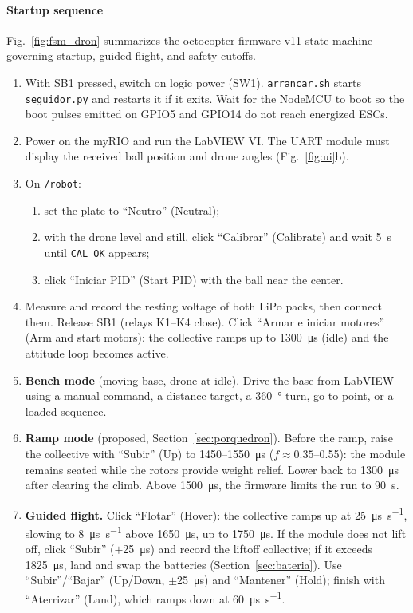 \paragraph{Startup sequence}
Fig.~\ref{fig:fsm_dron} summarizes the octocopter firmware v11 state machine governing startup, guided flight, and safety cutoffs.
\begin{enumerate}
  \item With SB1 pressed, switch on logic power (SW1). \texttt{arrancar.sh} starts \texttt{seguidor.py} and restarts it if it exits. Wait for the NodeMCU to boot so the boot pulses emitted on GPIO5 and GPIO14 do not reach energized ESCs.
  \item Power on the myRIO and run the LabVIEW VI. The UART module must display the received ball position and drone angles (Fig.~\ref{fig:ui}b).
  \item On \texttt{/robot}:
  \begin{enumerate}[label=\alph*.]
    \item set the plate to ``Neutro'' (Neutral);
    \item with the drone level and still, click ``Calibrar'' (Calibrate) and wait \SI{5}{\second} until \texttt{CAL OK} appears;
    \item click ``Iniciar PID'' (Start PID) with the ball near the center.
  \end{enumerate}
  \item Measure and record the resting voltage of both LiPo packs, then connect them. Release SB1 (relays K1--K4 close). Click ``Armar e iniciar motores'' (Arm and start motors): the collective ramps up to \SI{1300}{\micro\second} (idle) and the attitude loop becomes active.
  \item \textbf{Bench mode} (moving base, drone at idle). Drive the base from LabVIEW using a manual command, a distance target, a \SI{360}{\degree} turn, go-to-point, or a loaded sequence.
  \item \textbf{Ramp mode} (proposed, Section~\ref{sec:porquedron}). Before the ramp, raise the collective with ``Subir'' (Up) to 1450--\SI{1550}{\micro\second} ($f\approx0.35$--0.55): the module remains seated while the rotors provide weight relief. Lower back to \SI{1300}{\micro\second} after clearing the climb. Above \SI{1500}{\micro\second}, the firmware limits the run to \SI{90}{\second}.
  \item \textbf{Guided flight.} Click ``Flotar'' (Hover): the collective ramps up at \SI{25}{\micro\second\per\second}, slowing to \SI{8}{\micro\second\per\second} above \SI{1650}{\micro\second}, up to \SI{1750}{\micro\second}. If the module does not lift off, click ``Subir'' ($+$\SI{25}{\micro\second}) and record the liftoff collective; if it exceeds \SI{1825}{\micro\second}, land and swap the batteries (Section~\ref{sec:bateria}). Use ``Subir''/``Bajar'' (Up/Down, $\pm$\SI{25}{\micro\second}) and ``Mantener'' (Hold); finish with ``Aterrizar'' (Land), which ramps down at \SI{60}{\micro\second\per\second}.
\end{enumerate}

